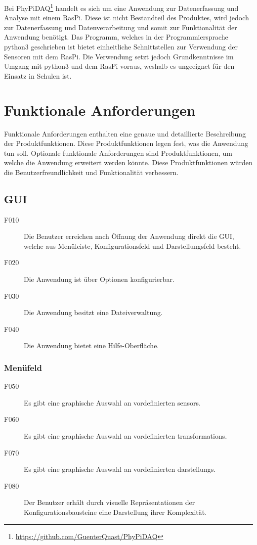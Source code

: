 \documentclass[parskip=full]{scrartcl}
\begin{document}
Bei PhyPiDAQ\footnote{\url{https://github.com/GuenterQuast/PhyPiDAQ}} handelt es sich um eine Anwendung zur Datenerfassung und Analyse mit einem \gls{RasPi}. Diese ist nicht Bestandteil des Produktes, wird jedoch zur Datenerfassung und Datenverarbeitung und somit zur Funktionalität der Anwendung  benötigt. Das Programm, welches in der Programmiersprache \gls{python3} geschrieben ist bietet einheitliche Schnittstellen zur Verwendung der Sensoren mit dem \gls{RasPi}. Die Verwendung setzt jedoch Grundkenntnisse im Umgang mit \gls{python3} und dem \gls{RasPi} voraus, weshalb es ungeeignet für den Einsatz in Schulen ist.

\clearpage
\section{Funktionale Anforderungen}\label{funktionale}

Funktionale Anforderungen enthalten eine genaue und detaillierte Beschreibung der Produktfunktionen. Diese Produktfunktionen legen fest, was die Anwendung tun soll. Optionale funktionale Anforderungen sind Produktfunktionen, um welche die Anwendung erweitert werden könnte. Diese Produktfunktionen würden die Benutzerfreundlichkeit und Funktionalität verbessern.


\subsection{GUI} %

\begin{description}
\item[F010] Die Benutzer erreichen nach Öffnung der Anwendung direkt die \gls{GUI}, welche aus Menüleiste, Konfigurationsfeld und Darstellungsfeld besteht.
\item[F020] Die Anwendung ist über Optionen konfigurierbar. 
\item[F030] Die Anwendung besitzt eine Dateiverwaltung.
\item[F040] Die Anwendung bietet eine Hilfe-Oberfläche.
\end{description}

\subsubsection{Menüfeld}

\begin{description}
\item[F050] Es gibt eine graphische Auswahl an vordefinierten \glspl{sensor}.
\item[F060] Es gibt eine graphische Auswahl an vordefinierten \glspl{transformation}.
\item[F070] Es gibt eine graphische Auswahl an vordefinierten \glspl{darstellung}.
\item[F080] Der Benutzer erhält durch visuelle Repräsentationen der Konfigurationsbausteine eine Darstellung ihrer Komplexität.
\end{description}
\end{document}

